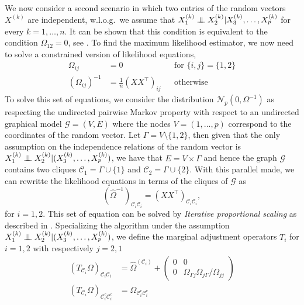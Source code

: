 We now consider a second scenario in which two entries of the random vectors $X^{(k)}$ are independent, w.l.o.g.\ we assume that $X^{(k)}_1 \perp\mkern-9.5mu\perp X^{(k)}_2 | X^{(k)}_3, \ldots, X^{(k)}_p$ for every $k = 1, \ldots, n$. It can be shown that this condition is equivalent to the condition $\Omega_{12} = 0$, see \cite[Proposition 5.2]{lauritzen1996}. To find the maximum likelihood estimator, we now need to solve a constrained version of likelihood equations,
\begin{align*}
    \Omega_{ij} &= 0 &&\text{for } \{i, j\} = \{ 1, 2\}\\
    \left(\Omega_{ij}\right)^{-1} &= \frac{1}{n}\left(XX^\top\right)_{ij} &&\text{otherwise}
\end{align*}
To solve this set of equations, we consider the distribution $\mathcal{N}_p(0, \Omega^{-1})$ as respecting the undirected pairwise Markov property with respect to an undirected graphical model $\mathcal{G} = (V, E)$ where the nodes $V = (1, \ldots, p)$ correspond to the coordinates of the random vector. Let $\Gamma = V \setminus \{1, 2\}$, then given that the only assumption on the independence relations of the random vector is $X^{(k)}_1 \perp\mkern-9.5mu\perp X^{(k)}_2 | (X^{(k)}_3, \ldots, X^{(k)}_p)$, we have that $E = V \times \Gamma$ and hence the graph $\mathcal{G}$ contains two cliques $\mathcal{C}_1 = \Gamma \cup \{1\}$ and $\mathcal{C}_2 = \Gamma \cup \{2\}$. With this parallel made, we can rewritte the likelihood equations in terms of the cliques of $\mathcal{G}$ as
\begin{equation*}
    \left(\hat\Omega^{-1}\right)_{\mathcal{C}_i\mathcal{C}_i} = \left(XX^\top\right)_{\mathcal{C}_i\mathcal{C}_i},
\end{equation*}
for $i = 1,2$. This set of equation can be solved by \textit{Iterative proportional scaling} as described in \cite[5.2.1]{lauritzen1996}. Specializing the algorithm under the assumption $X^{(k)}_1 \perp\mkern-9.5mu\perp X^{(k)}_2 | (X^{(k)}_3, \ldots, X^{(k)}_p)$, we define the marginal adjustment operators $T_i$ for $i = 1, 2$ with respectively $j = 2, 1$
\begin{align*}
    (T_{\mathcal{C}_i} \Omega)_{\mathcal{C}_i \mathcal{C}_i} &= \hat\Omega^{(\mathcal{C}_i)} + \left(\begin{matrix}
        0 & 0 \\
        0 &  \Omega_{\Gamma j} \Omega_{j \Gamma} / \Omega_{jj}
    \end{matrix}\right)\\
    (T_{\mathcal{C}_i} \Omega)_{\mathcal{C}_i^c \mathcal{C}_i^c} &= \Omega_{\mathcal{C}_i^c \mathcal{C}_i^c}
\end{align*}
